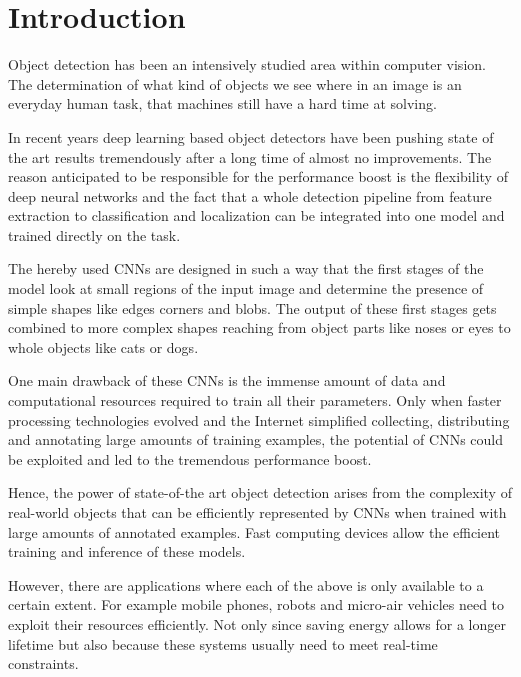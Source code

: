 \chapter{Introduction}
\label{sec:intro}

Object detection has been an intensively studied area within computer vision. The determination of what kind of objects we see where in an image is an everyday human task, that machines still have a hard time at solving.


In recent years deep learning based object detectors have been pushing state of the art results tremendously after a long time of almost no improvements. The reason anticipated to be responsible for the performance boost is the flexibility of deep neural networks and the fact that a whole detection pipeline from feature extraction to classification and localization can be integrated into one model and trained directly on the task.

The hereby used \acp{CNN} are designed in such a way that the first stages of the model look at small regions of the input image and determine the presence of simple shapes like edges corners and blobs. The output of these first stages gets combined to more complex shapes reaching from object parts like noses or eyes to whole objects like cats or dogs.

One main drawback of these \acp{CNN} is the immense amount of data and computational resources required to train all their parameters. Only when faster processing technologies evolved and the Internet simplified collecting, distributing and annotating large amounts of training examples, the potential of \acp{CNN} could be exploited  and led to the tremendous performance boost. 

Hence, the power of state-of-the art object detection arises from the complexity of real-world objects that can be efficiently represented by \acp{CNN} when trained with large amounts of annotated examples. Fast computing devices allow the efficient training and inference of these models.

However, there are applications where each of the above is only available to a certain extent. For example mobile phones, robots and micro-air vehicles need to exploit their resources efficiently. Not only since saving energy allows for a longer lifetime but also because these systems usually need to meet real-time constraints.

